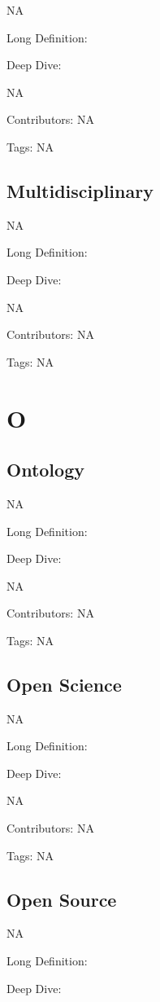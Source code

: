 \documentclass[
  letterpaper,
  DIV=11,
  numbers=noendperiod]{scrreprt}
\begin{document}
NA

Long Definition:

Deep Dive:

NA

Contributors: NA

Tags: NA

\section{Multidisciplinary}\label{multidisciplinary}

NA

Long Definition:

Deep Dive:

NA

Contributors: NA

Tags: NA


\chapter{O}\label{o}

\section{Ontology}\label{ontology}

NA

Long Definition:

Deep Dive:

NA

Contributors: NA

Tags: NA

\section{Open Science}\label{open-science}

NA

Long Definition:

Deep Dive:

NA

Contributors: NA

Tags: NA

\section{Open Source}\label{open-source}

NA

Long Definition:

Deep Dive:
\end{document}
